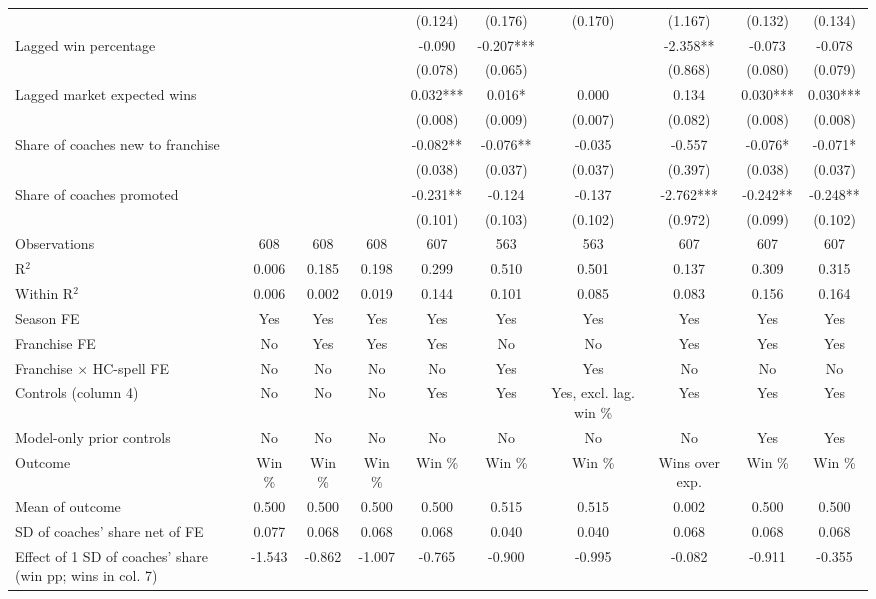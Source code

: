 \begin{table}[!h]
{\begin{threeparttable}
\begin{tabular}[t]{lccccccccc}
 &  &  &  & (0.124) & (0.176) & (0.170) & (1.167) & (0.132) & (0.134)\\
Lagged win percentage &  &  &  & -0.090 & -0.207*** &  & -2.358** & -0.073 & -0.078\\
 &  &  &  & (0.078) & (0.065) &  & (0.868) & (0.080) & (0.079)\\
Lagged market expected wins &  &  &  & 0.032*** & 0.016* & 0.000 & 0.134 & 0.030*** & 0.030***\\
 &  &  &  & (0.008) & (0.009) & (0.007) & (0.082) & (0.008) & (0.008)\\
Share of coaches new to franchise &  &  &  & -0.082** & -0.076** & -0.035 & -0.557 & -0.076* & -0.071*\\
 &  &  &  & (0.038) & (0.037) & (0.037) & (0.397) & (0.038) & (0.037)\\
Share of coaches promoted &  &  &  & -0.231** & -0.124 & -0.137 & -2.762*** & -0.242** & -0.248**\\
 &  &  &  & (0.101) & (0.103) & (0.102) & (0.972) & (0.099) & (0.102)\\
\midrule
Observations & 608 & 608 & 608 & 607 & 563 & 563 & 607 & 607 & 607\\
R$^2$ & 0.006 & 0.185 & 0.198 & 0.299 & 0.510 & 0.501 & 0.137 & 0.309 & 0.315\\
Within R$^2$ & 0.006 & 0.002 & 0.019 & 0.144 & 0.101 & 0.085 & 0.083 & 0.156 & 0.164\\
Season FE & Yes & Yes & Yes & Yes & Yes & Yes & Yes & Yes & Yes\\
Franchise FE & No & Yes & Yes & Yes & No & No & Yes & Yes & Yes\\
Franchise $\times$ HC-spell FE & No & No & No & No & Yes & Yes & No & No & No\\
Controls (column 4) & No & No & No & Yes & Yes & Yes, excl. lag. win \% & Yes & Yes & Yes\\
Model-only prior controls & No & No & No & No & No & No & No & Yes & Yes\\
Outcome & Win \% & Win \% & Win \% & Win \% & Win \% & Win \% & Wins over exp. & Win \% & Win \%\\
Mean of outcome & 0.500 & 0.500 & 0.500 & 0.500 & 0.515 & 0.515 & 0.002 & 0.500 & 0.500\\
SD of coaches' share net of FE & 0.077 & 0.068 & 0.068 & 0.068 & 0.040 & 0.040 & 0.068 & 0.068 & 0.068\\
Effect of 1 SD of coaches' share (win pp; wins in col. 7) & -1.543 & -0.862 & -1.007 & -0.765 & -0.900 & -0.995 & -0.082 & -0.911 & -0.355\\

\end{tabular}
\end{threeparttable}}
\end{table}
